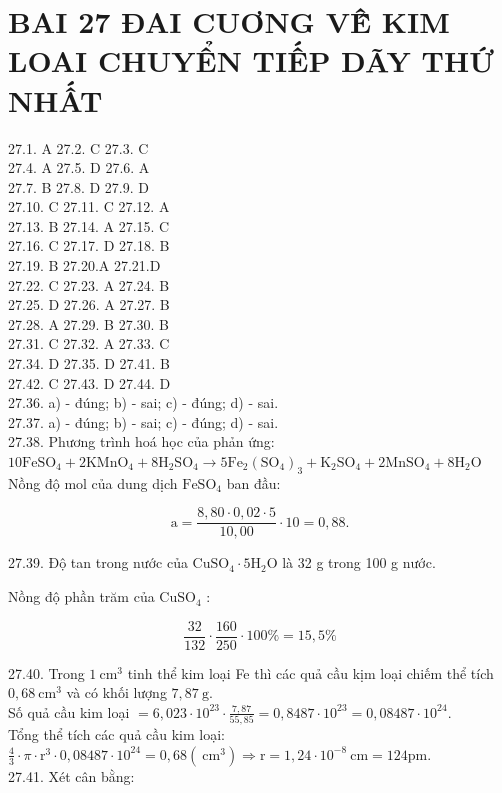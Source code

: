 \documentclass[10pt]{article}
\begin{document}
\section*{BAI 27 ĐAI CUƠNG VÊ̂ KIM LOAI CHUYỂN TIẾP DÃY THỨ NHẤT}
27.1. A 27.2. C 27.3. C\\
27.4. A 27.5. D 27.6. A\\
27.7. B 27.8. D 27.9. D\\
27.10. C 27.11. C 27.12. A\\
27.13. B 27.14. A 27.15. C\\
27.16. C 27.17. D 27.18. B\\
27.19. B 27.20.A 27.21.D\\
27.22. C 27.23. A 27.24. B\\
27.25. D 27.26. A 27.27. B\\
27.28. A 27.29. B 27.30. B\\
27.31. C 27.32. A 27.33. C\\
27.34. D 27.35. D 27.41. B\\
27.42. C 27.43. D 27.44. D\\
27.36. a) - đúng; b) - sai; c) - đúng; d) - sai.\\
27.37. a) - đúng; b) - sai; c) - đúng; d) - sai.\\
27.38. Phương trình hoá học của phản ứng:\\
$10 \mathrm{FeSO}_{4}+2 \mathrm{KMnO}_{4}+8 \mathrm{H}_{2} \mathrm{SO}_{4} \longrightarrow 5 \mathrm{Fe}_{2}\left(\mathrm{SO}_{4}\right)_{3}+\mathrm{K}_{2} \mathrm{SO}_{4}+2 \mathrm{MnSO}_{4}+8 \mathrm{H}_{2} \mathrm{O}$\\
Nồng độ mol của dung dịch $\mathrm{FeSO}_{4}$ ban đầu:

$$
\mathrm{a}=\frac{8,80 \cdot 0,02 \cdot 5}{10,00} \cdot 10=0,88 .
$$

27.39. Độ tan trong nước của $\mathrm{CuSO}_{4} \cdot 5 \mathrm{H}_{2} \mathrm{O}$ là 32 g trong 100 g nước.

Nồng độ phần trăm của $\mathrm{CuSO}_{4}$ :

$$
\frac{32}{132} \cdot \frac{160}{250} \cdot 100 \%=15,5 \%
$$

27.40. Trong $1 \mathrm{~cm}^{3}$ tinh thể kim loại Fe thì các quả cầu kịm loại chiếm thể tích $0,68 \mathrm{~cm}^{3}$ và có khối lượng $7,87 \mathrm{~g}$.\\
Số quả cầu kim loại $=6,023 \cdot 10^{23} \cdot \frac{7,87}{55,85}=0,8487 \cdot 10^{23}=0,08487 \cdot 10^{24}$.\\
Tổng thể tích các quả cầu kim loại:\\
$\frac{4}{3} \cdot \pi \cdot \mathrm{r}^{3} \cdot 0,08487 \cdot 10^{24}=0,68\left(\mathrm{~cm}^{3}\right) \Rightarrow \mathrm{r}=1,24 \cdot 10^{-8} \mathrm{~cm}=124 \mathrm{pm}$.\\
27.41. Xét cân bằng:
\end{document}
